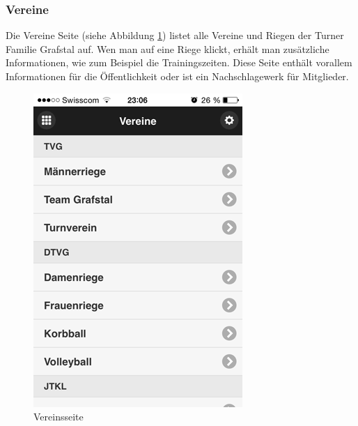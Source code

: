 \FloatBarrier
\subsubsection{Vereine}
Die Vereine Seite (siehe Abbildung \ref{fig:app_vereine})  listet alle Vereine und Riegen der Turner Familie Grafstal auf. Wen man auf eine Riege klickt, erhält man zusätzliche Informationen, wie zum Beispiel die Trainingszeiten. Diese Seite enthält vorallem Informationen für die Öffentlichkeit oder ist ein Nachschlagewerk für Mitglieder.


\begin{figure}[h]
\centering
\includegraphics[scale=0.5]{images/app/vereine.png}
\caption{Vereinsseite}
\label{fig:app_vereine}
\end{figure}

\newpage
\FloatBarrier
